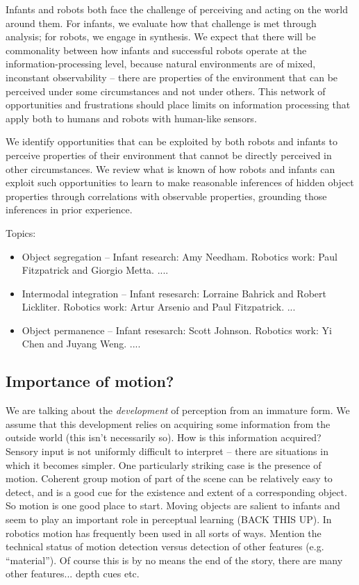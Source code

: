 
Infants and robots both face the challenge of perceiving and acting on
the world around them.  For infants, we evaluate how that challenge is
met through analysis; for robots, we engage in synthesis.  We expect
that there will be commonality between how infants and successful
robots operate at the information-processing level, because natural
environments are of mixed, inconstant observability -- there are
properties of the environment that can be perceived under some
circumstances and not under others.  This network of opportunities and
frustrations should place limits on information processing that apply
both to humans and robots with human-like sensors.

We identify opportunities that can be exploited by both robots and
infants to perceive properties of their environment that cannot be
directly perceived in other circumstances.  We review what is known of
how robots and infants can exploit such opportunities to learn to make
reasonable inferences of hidden object properties through correlations
with observable properties, grounding those inferences in prior
experience.

Topics:

\begin{itemize}

\item Object segregation --
  Infant research: Amy Needham.
  Robotics work: Paul Fitzpatrick and Giorgio Metta. ....

\item Intermodal integration --
  Infant resesarch: Lorraine Bahrick and Robert Lickliter.
  Robotics work: Artur Arsenio and Paul Fitzpatrick. ...

\item Object permanence --
  Infant resesarch: Scott Johnson.
  Robotics work: Yi Chen and Juyang Weng. ....

\end{itemize}


\subsection{Importance of motion?}

We are talking about the {\em development} of perception from an
immature form.  We assume that this development relies on acquiring
some information from the outside world (this isn't necessarily so).
How is this information acquired?  Sensory input is not 
uniformly difficult to interpret -- there are situations in
which it becomes simpler.  One particularly striking case is
the presence of motion.  Coherent group motion of part of the 
scene can be relatively easy to detect, and is a good cue for
the existence and extent of a corresponding object.  
So motion is one good place to start.
%
Moving objects are salient to infants and seem to play an
important role in perceptual learning (BACK THIS UP).
%
In robotics motion has frequently been used in all sorts of
ways.
%
Mention the technical status of motion detection versus
detection of other features (e.g. ``material'').
%
Of course this is by no means the end of the story, there 
are many other features... depth cues etc.


